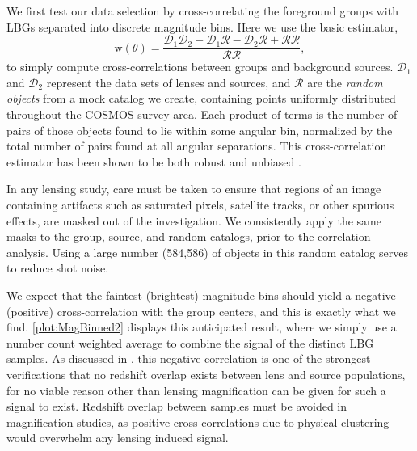 We first test our data selection by cross-correlating the foreground groups with \ac{LBG}s separated into discrete magnitude bins. Here we use the basic \citet{LandySzalay93} estimator, 
\begin{equation}
\mathrm{w}(\theta)=\frac{\mathscr{D}_1 \mathscr{D}_2 - \mathscr{D}_1 \mathscr{R} - \mathscr{D}_2 \mathscr{R} + \mathscr{R}\mathscr{R}}{\mathscr{R}\mathscr{R}},
\end{equation}
to simply compute cross-correlations between groups and background sources. $\mathscr{D}_1$ and $\mathscr{D}_2$ represent the data sets of lenses and sources, and $\mathscr{R}$ are the {\it random objects} from a mock catalog we create, containing points uniformly distributed throughout the \ac{COSMOS} survey area. Each product of terms is the number of pairs of those objects found to lie within some angular bin, normalized by the total number of pairs found at all angular separations.  This cross-correlation estimator has been shown to be both robust and unbiased \citep{Kerscher00}.  

In any lensing study, care must be taken to ensure that regions of an image containing artifacts such as saturated pixels, satellite tracks, or other spurious effects, are masked out of the investigation.  We consistently apply the same masks to the group, source, and random catalogs, prior to the correlation analysis. Using a large number (584,586) of objects in this random catalog serves to reduce shot noise.  

We expect that the faintest (brightest) magnitude bins should yield a negative (positive) cross-correlation with the group centers, and this is exactly what we find. \autoref{plot:MagBinned2} displays this anticipated result, where we simply use a number count weighted average to combine the signal of the distinct \ac{LBG} samples.  As discussed in \citet{Hildebrandt09b}, this negative correlation is one of the strongest verifications that no redshift overlap exists between lens and source populations, for no viable reason other than lensing magnification can be given for such a signal to exist.  Redshift overlap between samples must be avoided in magnification studies, as positive cross-correlations due to physical clustering would overwhelm any lensing induced signal.

